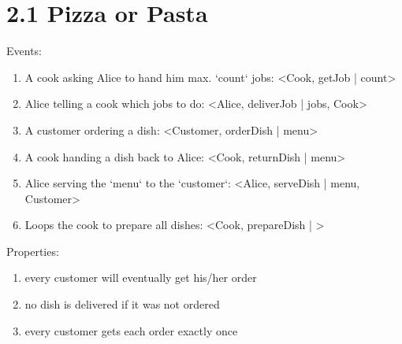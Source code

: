 \documentclass{article}
\begin{document}
	\pagestyle{fancy}
	
    \section*{2.1 Pizza or Pasta}
    
        Events:
        \begin{enumerate}
            \item A cook asking Alice to hand him max. `count` jobs: <Cook, getJob | count>
            \item Alice telling a cook which jobs to do: <Alice, deliverJob | jobs, Cook>
            \item A customer ordering a dish: <Customer, orderDish | menu>
            \item A cook handing a dish back to Alice: <Cook, returnDish | menu>
            \item Alice serving the `menu` to the `customer`: <Alice, serveDish | menu, Customer>
            \item Loops the cook to prepare all dishes: <Cook, prepareDish | >
        \end{enumerate}

        Properties:
        \begin{enumerate}
            \item every customer will eventually get his/her order
            \item no dish is delivered if it was not ordered  
            \item every customer gets each order exactly once
        \end{enumerate}
\end{document}
